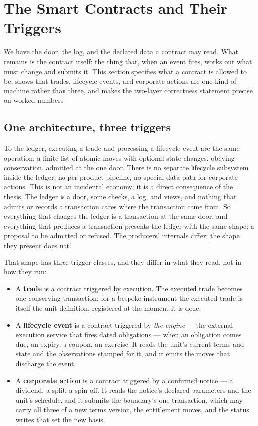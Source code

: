 \section{The Smart Contracts and Their Triggers}\label{sec:contracts}

We have the door, the log, and the declared data a contract may read. What remains
is the contract itself: the thing that, when an event fires, works out what must
change and submits it. This section specifies what a contract is allowed to be,
shows that trades, lifecycle events, and corporate actions are one kind of machine
rather than three, and makes the two-layer correctness statement precise on worked
numbers.

\subsection{One architecture, three triggers}

To the ledger, executing a trade and processing a lifecycle event are the same
operation: a finite list of atomic moves with optional state changes, obeying
conservation, admitted at the one door. There is no separate lifecycle subsystem
inside the ledger, no per-product pipeline, no special data path for corporate
actions. This is not an incidental economy; it is a direct consequence of the
thesis. The ledger is a door, some checks, a log, and views, and nothing that
admits or records a transaction cares where the transaction came from. So
everything that changes the ledger is a transaction at the same door, and
everything that produces a transaction presents the ledger with the same shape: a
proposal to be admitted or refused. The producers' internals differ; the shape they
present does not.

That shape has three trigger classes, and they differ in what they read, not in
how they run:

\begin{itemize}[leftmargin=1.5em]
\item A \textbf{trade} is a contract triggered by execution. The executed trade
becomes one conserving transaction; for a bespoke instrument the executed trade is
itself the unit definition, registered at the moment it is done.
\item A \textbf{lifecycle event} is a contract triggered by \emph{the engine} --- the
external execution service that fires dated obligations --- when an obligation comes
due, an expiry, a coupon, an exercise. It reads the unit's current terms and state
and the observations stamped for it, and it emits the moves that discharge the
event.
\item A \textbf{corporate action} is a contract triggered by a confirmed notice ---
a dividend, a split, a spin-off. It reads the notice's declared parameters and the
unit's schedule, and it submits the boundary's one transaction, which may carry all
three of a new terms version, the entitlement moves, and the status writes that set
the new basis.
\end{itemize}

